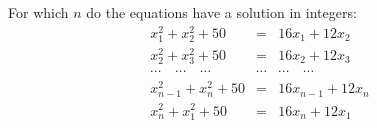 For which $n$ do the equations have a solution in integers:  \begin{eqnarray*}x_1 ^2 + x_2 ^2 + 50 &=& 16x_1 + 12x_2 \\ x_2 ^2 + x_3 ^2 + 50 &=& 16x_2 + 12x_3 \\ \cdots \quad \cdots \quad \cdots & \cdots & \cdots \quad \cdots \\ x_{n-1} ^2 + x_n ^2 + 50 &=& 16x_{n-1} + 12x_n \\ x_n ^2 + x_1 ^2 + 50 &=& 16x_n + 12x_1 \end{eqnarray*}
